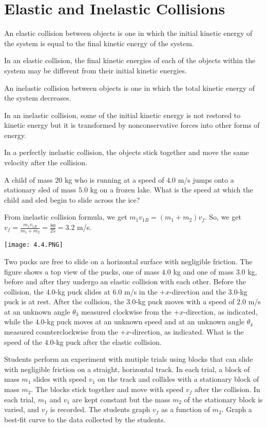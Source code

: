 \documentclass[../mech.tex]{subfiles}
\begin{document}
\section{Elastic and Inelastic Collisions}
An elastic collision between objects is one in which the initial kinetic energy of the system is equal to the final kinetic energy of the system.

In an elastic collision, the final kinetic energies of each of the objects within the system may be different from their initial kinetic energies.

An inelastic collision between objects is one in which the total kinetic energy of the system decreases.

In an inelastic collision, some of the initial kinetic energy is not restored to kinetic energy but it is transformed by nonconservative forces into other forms of energy.

In a perfectly inelastic collision, the objects stick together and move the same velocity after the collision.

\pagebreak
\begin{example}
    A child of mass $20$ kg who is running at a speed of $4.0$ m/s jumps onto a stationary sled of mass $5.0$ kg on a frozen lake. What is the speed at which the child and sled begin to slide across the ice?

    From inelastic collision formula, we get $m_1v_{1B}=(m_1+m_2)v_f$. So, we get $v_f=\frac{m_1v_{1B}}{m_1+m_2}=\frac{80}{25}=3.2$ m/s.
\end{example}

\ex \begin{center}
    \texttt{[image: 4.4.PNG]}
\end{center}
Two pucks are free to slide on a horizontal surface with negligible friction. The figure shows a top view of the pucks, one of mass $4.0$ kg and one of mass $3.0$ kg, before and after they undergo an elastic collision with each other.
Before the collision, the $4.0$-kg puck slides at $6.0$ m/s in the $+x$-direction and the $3.0$-kg puck is at rest. After the collision, the $3.0$-kg puck moves with a speed of $2.0$ m/s at an unknown angle 
$\theta_3$ measured clockwise from the $+x$-direction, as indicated, while the $4.0$-kg puck moves at an unknown speed and at an unknown angle $\theta_4$ measured counterclockwise from the $+x$-direction, as indicated. What is the speed of the $4.0$-kg puck after the elastic collision.

\ex Students perform an experiment with mutiple trials using blocks that can slide with negligible friction on a straight, horizontal track. In each trial, a block of mass $m_1$ slides with speed $v_1$ on the track and collides with a stationary block of mass $m_2$.
The blocks stick together and move with speed $v_f$ after the collision. In each trial, $m_1$ and $v_1$ are kept constant but the mass $m_2$ of the stationary block is varied, and $v_f$ is recorded. The students graph $v_f$ as a function of $m_2$.
Graph a best-fit curve to the data collected by the students.
\end{document}
